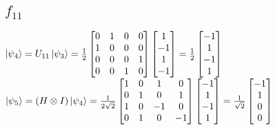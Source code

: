 \documentclass{iansnotes}
\begin{document}
\subsection{$f_{11}$}
$\ket{\psi_4} = U_{11} \ket{\psi_3} = \frac{1}{2}\begin{bmatrix} 0 & 1 & 0 & 0 \\ 1 & 0 & 0 & 0 \\ 0 & 0 & 0 & 1 \\ 0 & 0 & 1 & 0 \end{bmatrix}\begin{bmatrix} 1 \\ -1 \\ 1 \\ -1 \end{bmatrix} = \frac{1}{2}\begin{bmatrix} -1 \\ 1 \\ -1 \\ 1 \end{bmatrix}$\\[12mm]
\noindent$\ket{\psi_5} = (H \otimes I) \ket{\psi_4} = \frac{1}{2\sqrt{2}} \begin{bmatrix} 1 & 0 & 1 & 0 \\ 0 & 1 & 0 & 1 \\ 1 & 0 & -1 & 0 \\ 0 & 1 & 0 & -1 \end{bmatrix} \begin{bmatrix} -1 \\ 1 \\ -1 \\ 1 \end{bmatrix} = \frac{1}{\sqrt{2}} \begin{bmatrix} -1 \\ 1 \\ 0 \\ 0 \end{bmatrix}$\\[30mm]
\end{document}
